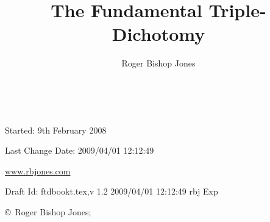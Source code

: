 \documentclass[10pt,titlepage,openany]{article}
\author{Roger Bishop Jones}
\title{The Fundamental Triple-Dichotomy}
\date{\ }
\begin{document}
\begin{titlepage}
\maketitle


\begin{centering}

{\footnotesize

Started: 9th February 2008

Last Change $ $Date: 2009/04/01 12:12:49 $ $

\href{http://www.rbjones.com/}{www.rbjones.com}

Draft $ $Id: ftdbookt.tex,v 1.2 2009/04/01 12:12:49 rbj Exp $ $

\copyright\ Roger Bishop Jones;

}%

\end{centering}

\thispagestyle{empty}
\end{titlepage}

{\parskip=0pt\tableofcontents}
\end{document}
